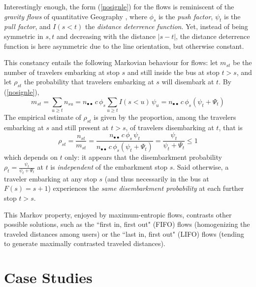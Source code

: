 \documentclass{bmcart}
\begin{document}
Interestingly enough, the form (\ref{nosignle}) for the flows is reminiscent of the {\em gravity flows} of quantitative Geography \cite{wilson1967statistical}  \cite{erlander1990gravity} \cite{bavaud2002quasi} \cite{Thomas-Agnan2021}, where 
$\phi_s$ is the {\em push factor}, $\psi_t$ is the {\em pull factor}, and $I(s<t)$ the {\em distance deterrence function}. Yet, instead of  
being symmetric in $s,t$ and decreasing with the distance $|s-t|$, the distance deterrence function is here asymmetric due to the line orientation, but otherwise constant. 

This constancy entails the following Markovian behaviour for flows: let $m_{st}$ be the number of travelers embarking at stop $s$ and still inside the bus at stop $t>s$, and let $\rho_{st}$ the probability that travelers embarking at $s$ will disembark at $t$. By (\ref{nosignle}), 
\begin{displaymath}
m_{st}=\sum_{u\ge t}n_{su}=n_{\bullet\bullet}\, c\, \phi_s  \sum_{u\ge t} I(s<u)\, \psi_u =n_{\bullet\bullet}\, c\,  \phi_s (\psi_t+\Psi_t) 
\end{displaymath}
The empirical estimate of $\rho_{st}$ is given by the proportion, among the travelers embarking at $s$ and 
 still present at $t>s$,  of travelers disembarking at $t$, that is 
\begin{displaymath}
\rho_{st}=\frac{n_{st}}{m_{st}}=\frac{n_{\bullet\bullet}\, c\,  \phi_s\,   \psi_t}{n_{\bullet\bullet}\, c\,  \phi_s (\psi_t+\Psi_t)}=\frac{\psi_t}{\psi_t+\Psi_t}\le 1 
\end{displaymath}
which depends on $t$ only: it appears that the disembarkment probability $\rho_t=\frac{\psi_t}{\psi_t+\Psi_t}$ at $t$ is {\em independent} of the embarkment stop $s$. Said otherwise, a traveler embarking at any stop $s$ (and thus necessarily in the bus at $F(s)=s+1$) experiences the {\em same disembarkment probability} at each further stop $t>s$. 


This Markov property, enjoyed by maximum-entropic flows, contrasts other possible solutions, such as  the ``first in, first out" (FIFO) flows (homogenizing the 
traveled distances among users) or the ``last in, first out" (LIFO) flows (tending to generate maximally  contrasted traveled distances).

 

\section{Case Studies}
\label{casestudies}
\end{document}
